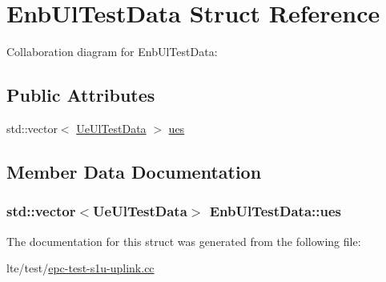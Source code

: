 \hypertarget{structEnbUlTestData}{}\section{Enb\+Ul\+Test\+Data Struct Reference}
\label{structEnbUlTestData}


Collaboration diagram for Enb\+Ul\+Test\+Data\+:
\subsection*{Public Attributes}
\begin{DoxyCompactItemize}
\item 
std\+::vector$<$ \hyperlink{structUeUlTestData}{Ue\+Ul\+Test\+Data} $>$ \hyperlink{structEnbUlTestData_a66bd6b7f7c3c77824fcb76fa72aa5237}{ues}
\end{DoxyCompactItemize}


\subsection{Member Data Documentation}
\subsubsection[{\texorpdfstring{ues}{ues}}]{\setlength{\rightskip}{0pt plus 5cm}std\+::vector$<${\bf Ue\+Ul\+Test\+Data}$>$ Enb\+Ul\+Test\+Data\+::ues}\hypertarget{structEnbUlTestData_a66bd6b7f7c3c77824fcb76fa72aa5237}{}\label{structEnbUlTestData_a66bd6b7f7c3c77824fcb76fa72aa5237}


The documentation for this struct was generated from the following file\+:\begin{DoxyCompactItemize}
\item 
lte/test/\hyperlink{epc-test-s1u-uplink_8cc}{epc-\/test-\/s1u-\/uplink.\+cc}\end{DoxyCompactItemize}
